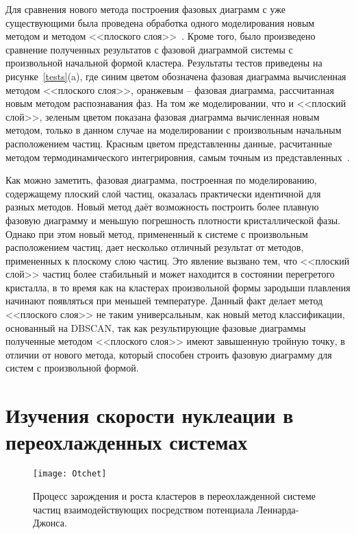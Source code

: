 Для сравнения нового метода построения фазовых диаграмм с уже существующими была проведена обработка одного моделирования новым методом и методом <<плоского слоя>>~\cite{10.1021/jp806127j, 10.1021/jp1117213}.
Кроме того, было произведено сравнение полученных результатов с фазовой диаграммой системы с произвольной начальной формой кластера.
Результаты тестов приведены на рисунке~\ref{tests}(a), где синим цветом обозначена фазовая диаграмма вычисленная методом <<плоского слоя>>, оранжевым -- фазовая диаграмма, рассчитанная новым методом распознавания фаз.
На том же моделировании, что и <<плоский слой>>, зеленым цветом показана фазовая диаграмма вычисленная новым методом, только в данном случае на моделировании с произвольным начальным расположением частиц.
Красным цветом представленны данные, расчитанные методом термодинамического интегрировния, самым точным из представленных~\cite{10.1080/00268976.2019.1699185}.

Как можно заметить, фазовая диаграмма, построенная по моделированию, содержащему плоский слой частиц, оказалась практически идентичной для разных методов.
Новый метод даёт возможность построить более плавную фазовую диаграмму и меньшую погрешность плотности кристаллической фазы.
Однако при этом новый метод, примененный к системе с произвольным расположением частиц, дает несколько отличный результат от методов, примененных к плоскому слою частиц.
Это явление вызвано тем, что <<плоский слой>> частиц более стабильный и может находится в состоянии перегретого кристалла, в то время как на кластерах произвольной формы зародыши плавления начинают появляться при меньшей температуре.
Данный факт делает метод <<плоского слоя>> не таким универсальным, как новый метод классификации, основанный на DBSCAN, так как результирующие фазовые диаграммы полученные методом <<плоского слоя>> имеют завышенную тройную точку, в отличии от нового метода, который способен строить фазовую диаграмму для систем с произвольной формой.


\section{Изучения скорости нуклеации в переохлажденных системах}
\label{PRIMe-SecNucleation}

\begin{figure}[!t]
  \centering
  \texttt{[image: Otchet]}
  \caption{Процесс зарождения и роста кластеров в переохлажденной системе частиц взаимодействующих посредством потенциала Леннарда-Джонса.}
  \label{otchet}
\end{figure}


